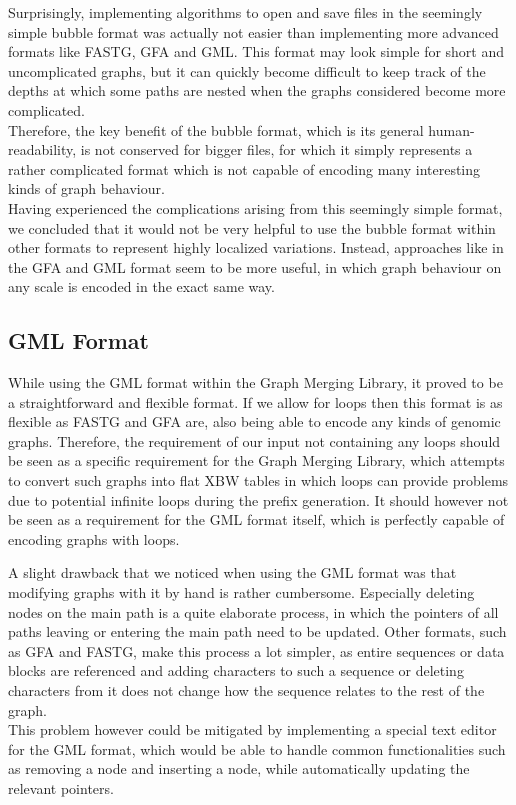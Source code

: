 \documentclass[a4paper,12pt,twoside,BCOR=10mm]{scrbook}
\begin{document}
Surprisingly, implementing algorithms to open and save files in the seemingly simple bubble format was actually 
not easier than implementing more advanced formats like FASTG, GFA and GML. 
This format may look simple for short and uncomplicated graphs, 
but it can quickly become difficult to keep track of the depths at which some paths 
are nested when the graphs considered become more complicated. \\
Therefore, the key benefit of the bubble format, which is its general human-readability, 
is not conserved for bigger files, for which it simply represents a rather complicated format 
which is not capable of encoding many interesting kinds of graph behaviour. \\
Having experienced the complications arising from this seemingly simple format, 
we concluded that it would not be very helpful to use the bubble format within 
other formats to represent highly localized variations. 
Instead, approaches like in the GFA and GML format seem to be more useful, 
in which graph behaviour on any scale is encoded in the exact same way.

\subsection{GML Format}

While using the GML format within the Graph Merging Library, 
it proved to be a straightforward and flexible format. 
If we allow for loops then this format is as flexible as FASTG and GFA are, 
also being able to encode any kinds of genomic graphs. 
Therefore, the requirement of our input not containing any loops should be 
seen as a specific requirement for the Graph Merging Library, which attempts 
to convert such graphs into flat XBW tables in which loops can provide problems 
due to potential infinite loops during the prefix generation. 
It should however not be seen as a requirement for the GML format itself, 
which is perfectly capable of encoding graphs with loops.

A slight drawback that we noticed when using the GML format was that 
modifying graphs with it by hand is rather cumbersome. 
Especially deleting nodes on the main path is a quite elaborate process, 
in which the pointers of all paths leaving or entering the main path 
need to be updated. 
Other formats, such as GFA and FASTG, make this process a lot simpler, 
as entire sequences or data blocks are referenced and adding characters to such a 
sequence or deleting characters from it does not change how the sequence 
relates to the rest of the graph. \\
This problem however could be mitigated by implementing a special text editor 
for the GML format, which would be able to handle common functionalities such as 
removing a node and inserting a node, while automatically updating the relevant pointers.
\end{document}
